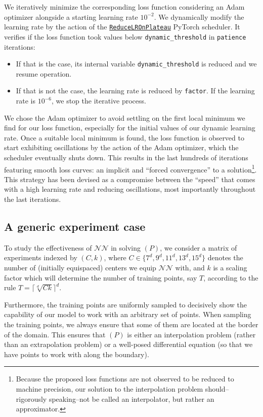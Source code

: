 \documentclass[12pt]{report} %
\begin{document}
We iteratively minimize the corresponding loss function considering an Adam optimizer alongside a starting learning rate $10^{-2}$. We dynamically modify the learning rate by the action of the \href{https://pytorch.org/docs/stable/generated/torch.optim.lr_scheduler.ReduceLROnPlateau.html}{\texttt{ReduceLROnPlateau}} PyTorch scheduler. It verifies if the loss function took values below \texttt{dynamic\_threshold} in \texttt{patience} iterations:
\begin{itemize}
  \item If that is the case, its internal variable \texttt{dynamic\_threshold} is reduced and we resume operation.
  \item If that is not the case, the learning rate is reduced by \texttt{factor}. If the learning rate is $10^{-6}$, we stop the iterative process.
\end{itemize}

We chose the Adam optimizer to avoid settling on the first local minimum we find for our loss function, especially for the initial values of our dynamic learning rate. Once a suitable local minimum is found, the loss function is observed to start exhibiting oscillations by the action of the Adam optimizer, which the scheduler eventually shuts down. This results in the last hundreds of iterations featuring smooth loss curves: an implicit and ``forced convergence'' to a solution\footnote{Because the proposed loss functions are not observed to be reduced to machine precision, our solution to the interpolation problem should--rigorously speaking--not be called an interpolator, but rather an approximator.}. This strategy has been devised as a compromise between the ``speed'' that comes with a high learning rate and reducing oscillations, most importantly throughout the last iterations.

\subsection{A generic experiment case}

To study the effectiveness of $\mathcal{NN}$ in solving $(P)$, we consider a matrix of experiments indexed by $(C,k)$, where $C \in \{7^d,9^d,11^d,13^d,15^d\}$ denotes the number of (initially equispaced) centers we equip $\mathcal{NN}$ with, and $k$ is a scaling factor which will determine the number of training points, say $T$, according to the rule
$T = \lceil \sqrt[d]{C  k} \rceil ^d $.

Furthermore, the training points are uniformly sampled to decisively show the capability of our model to work with an arbitrary set of points. When sampling the training points, we always ensure that some of them are located at the border of the domain. This ensures that $(P)$ is either an interpolation problem (rather than an extrapolation problem) or a well-posed differential equation (so that we have points to work with along the boundary).
\end{document}
